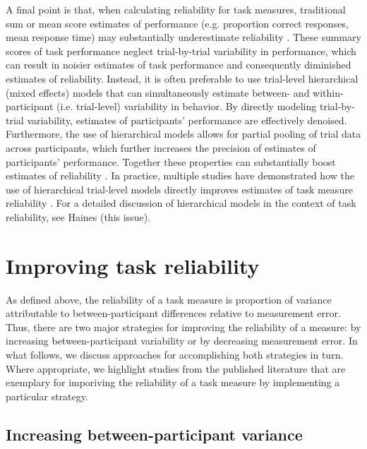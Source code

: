 \documentclass[a4paper,notitlepage,12pt]{article}
\begin{document}
A final point is that, when calculating reliability for task measures, traditional sum or mean score estimates of performance (e.g. proportion correct responses, mean response time) may substantially underestimate reliability \cite{Rouder2019-am, haines2020learning}. These summary scores of task performance neglect trial-by-trial variability in performance, which can result in noisier estimates of task performance and consequently diminished estimates of reliability. Instead, it is often preferable to use trial-level hierarchical (mixed effects) models that can simultaneously estimate between- and within-participant (i.e. trial-level) variability in behavior. By directly modeling trial-by-trial variability, estimates of participants' performance are effectively denoised. Furthermore, the use of hierarchical models allows for partial pooling of trial data across participants, which further increases the precision of estimates of participants' performance. Together these properties can substantially boost estimates of reliability \cite{Rouder2019-am, haines2020learning}. In practice, multiple studies have demonstrated how the use of hierarchical trial-level models directly improves estimates of task measure reliability \cite{snijder2022psychometric, sullivan2022enhancing, brown2020improving, waltmann2022sufficient}. For a detailed discussion of hierarchical models in the context of task reliability, see Haines (this issue).

\section{Improving task reliability}

As defined above, the reliability of a task measure is proportion of variance attributable to between-participant differences relative to measurement error. Thus, there are two major strategies for improving the reliability of a measure: by increasing between-participant variability or by decreasing measurement error. In what follows, we discuss approaches for accomplishing both strategies in turn. Where appropriate, we highlight studies from the published literature that are exemplary for imporiving the reliability of a task measure by implementing a particular strategy. 

\subsection{Increasing between-participant variance}
\end{document}
